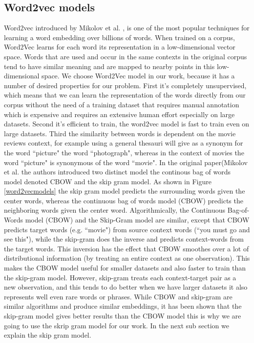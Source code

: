 \documentclass{article}
\begin{document}
\subsection{Word2vec models}
Word2vec introduced by Mikolov et al. \cite{mikolov:2013}, is one of the most popular techniques for learning a word embedding over billions of words. When trained on a corpus, Word2Vec learns for each word its representation in a low-dimensional vector space. Words that are used and occur in the same contexts in the original corpus tend to have similar meaning and are mapped to nearby points in this low-dimensional space. We choose Word2Vec model in our work, because it has a number of desired properties for our problem. First it's completely unsupervised, which means that we can learn the representation of the words directly from our corpus without the need of a training dataset that requires manual annotation which is expensive and requires
an extensive human effort especially on large datasets. Second it's efficient to train, the word2vec model is  fast to train even on large datasets. 
Third the similarity between words is dependent on the movie reviews context, for example using a general thesauri will give as a synonym for the word ``picture" the word ``photograph", whereas in the context of movies the word ``picture" is synonymous of the word ``movie".
In the original paper(Mikolov et al. \cite{mikolov:2013} the authors introduced two distinct model the continous bag of words model denoted CBOW and the skip gram model. 
As shown in Figure \ref{word2vecmodels} the skip gram model predicts the surrounding words given the center words, whereas  the continuous bag of words model (CBOW) predicts the neighboring words given the center word.
Algorithmically, the Continuous Bag-of-Words model (CBOW) and the Skip-Gram model are similar, except that CBOW predicts target words (e.g. ``movie") from source context words (``you must go and see this"), while the skip-gram does the inverse and predicts  context-words from the target words. This inversion has the effect that CBOW smoothes over a lot of distributional information (by treating an entire context as one observation). This makes the CBOW model useful for smaller datasets and also faster to train than the skip-gram model. However, skip-gram treats each context-target pair as a new observation, and this tends to do better when we have larger datasets it also represents well even rare words or phrases. 
While CBOW and skip-gram are similar algorithms and produce similar embeddings, it has been shown that the skip-gram model gives better results than the CBOW model \cite{mikolov:2013} this is why we are going to use the skrip gram model for our work.
In the next sub section we explain the skip gram model.
\end{document}
